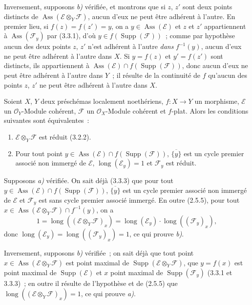 Inversement, supposons \emph{b)} vérifiée, et montrons que si $z$, $z'$ sont
deux points distincts de $\operatorname{Ass}(\mathcal E\otimes_Y\mathcal F)$,
aucun d'eux ne peut être adhérent à l'autre. En premier lieu, si
$f(z)=f(z')=y$, on a $y\in\operatorname{Ass}(\mathcal E)$ et $z$ et $z'$
appartiennent à $\operatorname{Ass}(\mathcal F_y)$ par (3.3.1), d'où
$y\in f(\operatorname{Supp}(\mathcal F))$~; comme par hypothèse aucun des deux
points $z$, $z'$ n'est adhérent à l'autre \emph{dans} $f^{-1}(y)$, aucun d'eux
ne peut être adhérent à l'autre dans $X$. Si $y=f(z)$ et $y'=f(z')$ sont
distincts, ils appartiennent à
$\operatorname{Ass}(\mathcal E)\cap f(\operatorname{Supp}(\mathcal F))$, donc
aucun d'eux ne peut être adhérent à l'autre dans $Y$~; il résulte de la
continuité de $f$ qu'aucun des points $z$, $z'$ ne peut être adhérent à
l'autre dans $X$.

\begin{proposition}[3.3.4]
\label{IV.2.3.3.4-fr}
Soient $X$, $Y$ deux préschémas localement noethériens, $f:X\to Y$ un
morphisme, $\mathcal E$ un $\mathcal O_Y$-Module cohérent, $\mathcal F$ un
$\mathcal O_X$-Module cohérent et $f$-plat. Alors les conditions suivantes
sont équivalentes~:
\begin{enumerate}
\item[\emph{a)}] $\mathcal E\otimes_Y\mathcal F$ est réduit (3.2.2).
\item[\emph{b)}] Pour tout point
$y\in\operatorname{Ass}(\mathcal E)\cap f(\operatorname{Supp}(\mathcal F))$,
$\overline{\{y\}}$ est un cycle premier associé non immergé de $\mathcal E$,
$\operatorname{long}(\mathcal E_y)=1$ et $\mathcal F_y$ est réduit.
\end{enumerate}
\end{proposition}

Supposons \emph{a)} vérifiée. On sait déjà (3.3.3) que pour tout
$y\in\operatorname{Ass}(\mathcal E)\cap f(\operatorname{Supp}(\mathcal F))$,
$\overline{\{y\}}$ est un cycle premier associé non immergé de $\mathcal E$ et
$\mathcal F_y$ est sans cycle premier associé immergé. En outre (2.5.5), pour
tout $x\in\operatorname{Ass}(\mathcal E\otimes_Y\mathcal F)\cap f^{-1}(y)$,
on a
\[
1=\operatorname{long}((\mathcal E\otimes_Y\mathcal F)_x)
=\operatorname{long}(\mathcal E_y)\cdot\operatorname{long}((\mathcal F_y)_x),
\]
donc $\operatorname{long}(\mathcal E_y)
=\operatorname{long}((\mathcal F_y)_x)=1$, ce qui prouve \emph{b)}.

Inversement, supposons \emph{b)} vérifiée~; on sait déjà que tout point
$x\in\operatorname{Ass}(\mathcal E\otimes_Y\mathcal F)$ est point maximal de
$\operatorname{Supp}(\mathcal E\otimes_Y\mathcal F)$, que $y=f(x)$ est point
maximal de $\operatorname{Supp}(\mathcal E)$ et $x$ point maximal de
$\operatorname{Supp}(\mathcal F_y)$ (3.3.1 et 3.3.3)~; en outre il résulte de
l'hypothèse et de (2.5.5) que
$\operatorname{long}((\mathcal E\otimes_Y\mathcal F)_x)=1$, ce qui prouve
\emph{a)}.

